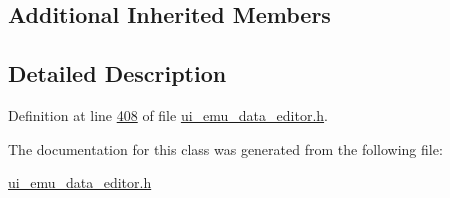 \subsection*{Additional Inherited Members}


\subsection{Detailed Description}


Definition at line \hyperlink{a00051_source_l00408}{408} of file \hyperlink{a00051_source}{ui\+\_\+emu\+\_\+data\+\_\+editor.\+h}.



The documentation for this class was generated from the following file\+:\begin{DoxyCompactItemize}
\item 
\hyperlink{a00051}{ui\+\_\+emu\+\_\+data\+\_\+editor.\+h}\end{DoxyCompactItemize}
